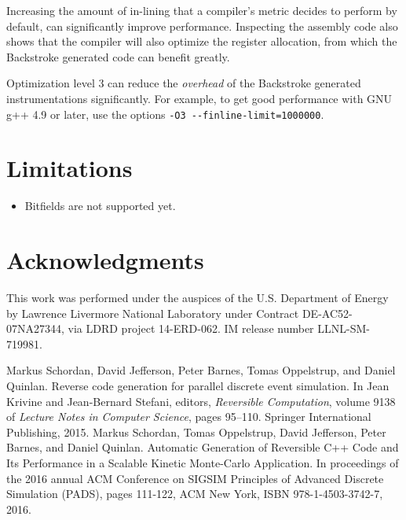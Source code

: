 \documentclass[english,12pt, titlepage]{article}      %
\begin{document}
Increasing the amount of in-lining that a compiler's metric decides to
perform by default, can significantly improve performance.  Inspecting
the assembly code also shows that the compiler will also optimize the
register allocation, from which the Backstroke generated code can
benefit greatly.

Optimization level 3 can reduce the {\em overhead} of
the Backstroke generated instrumentations significantly. For example,
to get good performance with GNU g++ 4.9 or later, use the options \verb+-O3 --finline-limit=1000000+.

\section{Limitations}

\begin{itemize}
\item Bitfields are not supported yet.
\end{itemize}

\section{Acknowledgments}

This work was performed under the auspices of the U.S. Department of
Energy by Lawrence Livermore National Laboratory under Contract
DE-AC52-07NA27344, via LDRD project 14-ERD-062. IM release number
LLNL-SM-719981.

\begin{thebibliography}{1}

Markus Schordan, David Jefferson, Peter Barnes, Tomas Oppelstrup, and Daniel
  Quinlan.
\newblock Reverse code generation for parallel discrete event simulation.
\newblock In Jean Krivine and Jean-Bernard Stefani, editors, {\em Reversible
  Computation}, volume 9138 of {\em Lecture Notes in Computer Science}, pages
  95--110. Springer International Publishing, 2015.
Markus Schordan, Tomas Oppelstrup, David Jefferson, Peter Barnes, and Daniel
  Quinlan.
\newblock Automatic Generation of Reversible C++ Code and Its Performance in a Scalable Kinetic Monte-Carlo Application.
\newblock In proceedings of the 2016 annual ACM Conference on SIGSIM Principles of Advanced Discrete Simulation (PADS), pages 111-122, ACM New York, ISBN 978-1-4503-3742-7, 2016.
\end{thebibliography}

%
% 
\end{document}
